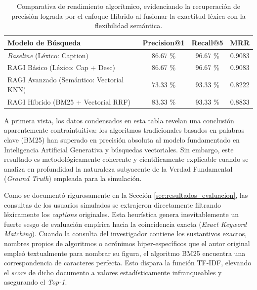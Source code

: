 \documentclass[a4paper]{report}
\begin{document}
\begin{table}[H]
    \centering
    \begin{tabular}{|l|c|c|c|}
        \hline
        \textbf{Modelo de Búsqueda} & \textbf{Precision@1} & \textbf{Recall@5} & \textbf{MRR} \\ \hline
        \textit{Baseline} (Léxico: Caption) & 86.67 \% & 96.67 \% & 0.9083 \\ \hline
        RAGI Básico (Léxico: Cap + Desc) & 86.67 \% & 96.67 \% & 0.9083 \\ \hline
        RAGI Avanzado (Semántico: Vectorial KNN) & 73.33 \% & 93.33 \% & 0.8222 \\ \hline
        RAGI Híbrido (BM25 + Vectorial RRF) & 83.33 \% & 93.33 \% & 0.8833 \\ \hline
    \end{tabular}
    \caption{Comparativa de rendimiento algorítmico, evidenciando la recuperación de precisión lograda por el enfoque Híbrido al fusionar la exactitud léxica con la flexibilidad semántica.}
    \label{tab:resultados_cuantitativos}
\end{table}

A primera vista, los datos condensados en esta tabla revelan una conclusión aparentemente contraintuitiva: los algoritmos tradicionales basados en palabras clave (BM25) han superado en precisión absoluta al modelo fundamentado en Inteligencia Artificial Generativa y búsquedas vectoriales. Sin embargo, este resultado es metodológicamente coherente y científicamente explicable cuando se analiza en profundidad la naturaleza subyacente de la Verdad Fundamental (\textit{Ground Truth}) empleada para la simulación.

Como se documentó rigurosamente en la Sección \ref{sec:resultados_evaluacion}, las consultas de los usuarios simulados se extrajeron directamente filtrando léxicamente los \textit{captions} originales. Esta heurística genera inevitablemente un fuerte sesgo de evaluación empírica hacia la coincidencia exacta (\textit{Exact Keyword Matching}). Cuando la consulta del investigador contiene los sustantivos exactos, nombres propios de algoritmos o acrónimos hiper-específicos que el autor original empleó textualmente para nombrar su figura, el algoritmo BM25 encuentra una correspondencia de caracteres perfecta. Esto dispara la función TF-IDF, elevando el \textit{score} de dicho documento a valores estadísticamente infranqueables y asegurando el \textit{Top-1}.
\end{document}
